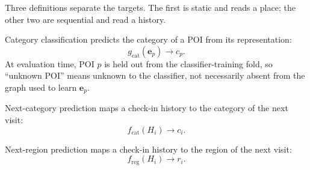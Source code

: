 Three definitions separate the targets. The first is static and reads a place; the
other two are sequential and read a history.

\begin{definition}\label{def:fund:catclf}
    Category classification predicts the category of a POI from its representation:
    \begin{equation}
        g_{\mathrm{cat}}(\mathbf{e}_p)\longrightarrow c_p.
    \end{equation}
    At evaluation time, POI $p$ is held out from the classifier-training fold, so
    ``unknown POI'' means unknown to the classifier, not necessarily absent from the graph
    used to learn $\mathbf{e}_p$.
\end{definition}

\begin{definition}\label{def:fund:nextcat}
    Next-category prediction maps a check-in history to the category of the next visit:
    \begin{equation}
        f_{\mathrm{cat}}(H_i)\longrightarrow c_i.
    \end{equation}
\end{definition}

\begin{definition}\label{def:fund:nextreg}
    Next-region prediction maps a check-in history to the region of the next visit:
    \begin{equation}
        f_{\mathrm{reg}}(H_i)\longrightarrow r_i.
    \end{equation}
\end{definition}

